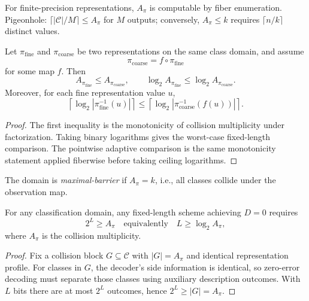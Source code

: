 \begin{remark}
For finite-precision representations, $A_\pi$ is computable by fiber enumeration. Pigeonhole: $\lceil |\mathcal C|/M \rceil \le A_\pi$ for $M$ outputs; conversely, $A_\pi \le k$ requires $\lceil n/k \rceil$ distinct values.
\end{remark}

\begin{corollary}\label{cor:concept-bottleneck-mono}
Let $\pi_{\mathrm{fine}}$ and $\pi_{\mathrm{coarse}}$ be two representations on the same class domain, and assume
\[
\pi_{\mathrm{coarse}} = f \circ \pi_{\mathrm{fine}}
\]
for some map $f$. Then
\[
A_{\pi_{\mathrm{fine}}} \le A_{\pi_{\mathrm{coarse}}},
\qquad
\log_2 A_{\pi_{\mathrm{fine}}} \le \log_2 A_{\pi_{\mathrm{coarse}}}.
\]
Moreover, for each fine representation value $u$,
\[
\left\lceil \log_2 \left|\pi_{\mathrm{fine}}^{-1}(u)\right| \right\rceil
\le
\left\lceil \log_2 \left|\pi_{\mathrm{coarse}}^{-1}(f(u))\right| \right\rceil.
\]
\end{corollary}

\begin{proof}
The first inequality is the monotonicity of collision multiplicity under factorization. Taking binary logarithms gives the worst-case fixed-length comparison. The pointwise adaptive comparison is the same monotonicity statement applied fiberwise before taking ceiling logarithms.
\end{proof}

\begin{definition}\label{def:max-barrier}
The domain is \emph{maximal-barrier} if $A_\pi = k$, i.e., all classes collide under the observation map.
\end{definition}

\begin{theorem}[Converse]\label{thm:converse}
For any classification domain, any fixed-length scheme achieving $D=0$ requires
\[
2^L \ge A_\pi
\quad\text{equivalently}\quad
L \ge \log_2 A_\pi,
\]
where $A_\pi$ is the collision multiplicity.
\end{theorem}

\begin{proof}
Fix a collision block $G \subseteq \mathcal{C}$ with $|G|=A_\pi$ and identical representation profile. For classes in $G$, the decoder's side information is identical, so zero-error decoding must separate those classes using auxiliary description outcomes. With $L$ bits there are at most $2^L$ outcomes, hence $2^L \ge |G| = A_\pi$.
\end{proof}

